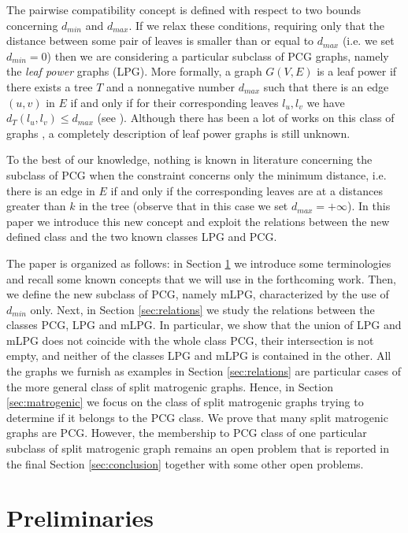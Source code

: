 \documentclass[dvipdfm]{llncs}
\newcommand{\dmin}{d_{min}}
\newcommand{\dmax}{d_{max}}
\begin{document}
The pairwise compatibility concept is defined with respect to two bounds concerning $\dmin$ and $\dmax$. If we relax these conditions, requiring only that the distance between some pair of leaves is smaller than or equal to $\dmax$ (i.e. we set $\dmin=0$) then we are considering a particular subclass of PCG graphs, namely the \textsl{leaf power} graphs (LPG). More formally, a graph $G(V,E)$ is a leaf power if there exists a tree $T$ and a nonnegative number $\dmax$ such that there is an edge $(u,v)$ in $E$ if and only if for their corresponding leaves $l_u, l_v$ we have $d_T(l_u, l_v) \leq \dmax$ (see \cite{NRTh02}). Although there has been a lot of works on this class of graphs \cite{B}, a completely description of leaf power graphs is still unknown. 


To the best of our knowledge, nothing is known in literature concerning the subclass of PCG when the constraint concerns only the minimum distance, i.e. there is an edge in $E$ if and only if the corresponding leaves are at a distances greater than $k$ in the tree (observe that in this case we set $\dmax=+ \infty$). In this paper we introduce this new concept and exploit the relations between the new defined class and the two known classes LPG and PCG.

The paper is organized as follows: in Section \ref{sec:preliminaries} we introduce some terminologies and recall some known concepts that we will use in the forthcoming work. Then, we define the new subclass of PCG, namely mLPG, characterized by the use of $d_{min}$ only. Next, in Section \ref{sec:relations} we study the relations between the classes PCG, LPG and mLPG. In particular, we show that the union of LPG and mLPG does not coincide with the whole class PCG, their intersection is not empty, and neither of the classes LPG and mLPG is contained in the other. All the graphs we furnish as examples in Section \ref{sec:relations} are particular cases of the more general class of split matrogenic graphs. Hence, in Section \ref{sec:matrogenic} we focus on the class of split matrogenic graphs trying to determine if it belongs to the PCG class. We prove that many split matrogenic graphs are PCG. However, the membership to PCG class of one particular subclass of split matrogenic graph remains an open problem that is reported in the final Section \ref{sec:conclusion} together with some other open problems.
\section{Preliminaries}\label{sec:preliminaries}
\end{document}
